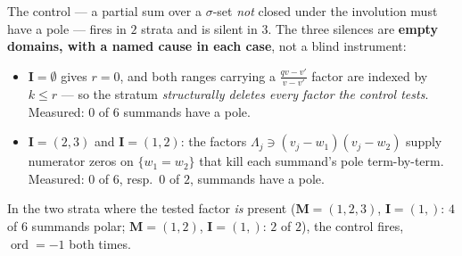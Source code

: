 \documentclass[11pt]{article}
\theoremstyle{plain}
\theoremstyle{definition}
\theoremstyle{remark}
\theoremstyle{plain}
\newcommand{\bI}{\mathbf{I}}
\newcommand{\bM}{\mathbf{M}}
\newcommand{\ord}{\operatorname{ord}}
\begin{document}
The control --- a partial sum over a $\sigma$-set \emph{not} closed under the
involution must have a pole --- fires in $2$ strata and is silent in $3$.  The
three silences are \textbf{empty domains, with a named cause in each case}, not a
blind instrument:
\begin{itemize}
\item $\bI=\emptyset$ gives $r=0$, and both ranges carrying a
  $\frac{qv-v'}{v-v'}$ factor are indexed by $k\le r$ --- so the stratum
  \emph{structurally deletes every factor the control tests}.  Measured: $0$ of
  $6$ summands have a pole.
\item $\bI=(2,3)$ and $\bI=(1,2)$: the factors
  $\Lambda_j\ni(v_j-w_1)(v_j-w_2)$ supply numerator zeros on $\{w_1=w_2\}$ that
  kill each summand's pole term-by-term.  Measured: $0$ of $6$, resp.\ $0$ of
  $2$, summands have a pole.
\end{itemize}
In the two strata where the tested factor \emph{is} present ($\bM=(1,2,3)$,
$\bI=(1,)$: $4$ of $6$ summands polar; $\bM=(1,2)$, $\bI=(1,)$: $2$ of $2$), the
control fires, $\ord=-1$ both times.
\end{document}
